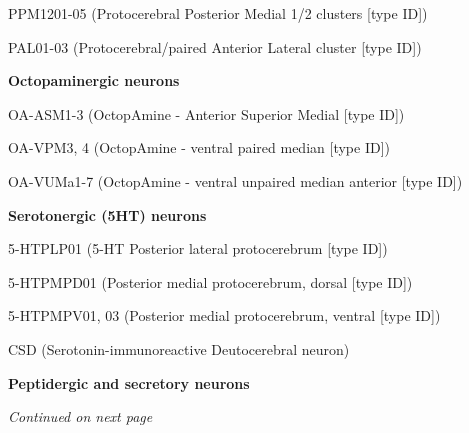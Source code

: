 \documentclass{article}
\begin{document}
{\noindent\hspace*{1.0em}PPM1201-05 (Protocerebral Posterior Medial 1/2 clusters [type ID])\par
\noindent\hspace*{1.0em}PAL01-03 (Protocerebral/paired Anterior Lateral cluster [type ID])\par
\noindent\textbf{Octopaminergic neurons}\par
\noindent\hspace*{1.0em}OA-ASM1-3 (OctopAmine - Anterior Superior Medial [type ID])\par
\noindent\hspace*{1.0em}OA-VPM3, 4 (OctopAmine - ventral paired median [type ID])\par
\noindent\hspace*{1.0em}OA-VUMa1-7 (OctopAmine - ventral unpaired median anterior [type ID])\par
\noindent\textbf{Serotonergic (5HT) neurons}\par
\noindent\hspace*{1.0em}5-HTPLP01 (5-HT Posterior lateral protocerebrum [type ID])\par
\noindent\hspace*{1.0em}5-HTPMPD01 (Posterior medial protocerebrum, dorsal [type ID])\par
\noindent\hspace*{1.0em}5-HTPMPV01, 03 (Posterior medial protocerebrum, ventral [type ID])\par
\noindent\hspace*{1.0em}CSD (Serotonin-immunoreactive Deutocerebral neuron)\par
\noindent\textbf{Peptidergic and secretory neurons}\par
}
\noindent\emph{Continued on next page}
\end{document}
